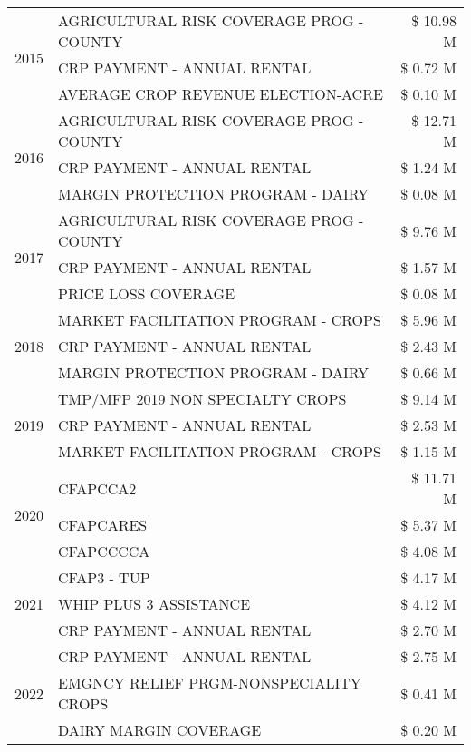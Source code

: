 \begin{tabular}{llr}
\cline{1-3}
\multirow[t]{3}{*}{2015} & AGRICULTURAL RISK COVERAGE PROG - COUNTY & \$ 10.98 M \\
 & CRP PAYMENT - ANNUAL RENTAL & \$ 0.72 M \\
 & AVERAGE CROP REVENUE ELECTION-ACRE & \$ 0.10 M \\
\cline{1-3}
\multirow[t]{3}{*}{2016} & AGRICULTURAL RISK COVERAGE PROG - COUNTY & \$ 12.71 M \\
 & CRP PAYMENT - ANNUAL RENTAL & \$ 1.24 M \\
 & MARGIN PROTECTION PROGRAM - DAIRY & \$ 0.08 M \\
\cline{1-3}
\multirow[t]{3}{*}{2017} & AGRICULTURAL RISK COVERAGE PROG - COUNTY & \$ 9.76 M \\
 & CRP PAYMENT - ANNUAL RENTAL & \$ 1.57 M \\
 & PRICE LOSS COVERAGE & \$ 0.08 M \\
\cline{1-3}
\multirow[t]{3}{*}{2018} & MARKET FACILITATION PROGRAM - CROPS & \$ 5.96 M \\
 & CRP PAYMENT - ANNUAL RENTAL & \$ 2.43 M \\
 & MARGIN PROTECTION PROGRAM - DAIRY & \$ 0.66 M \\
\cline{1-3}
\multirow[t]{3}{*}{2019} & TMP/MFP 2019 NON SPECIALTY CROPS & \$ 9.14 M \\
 & CRP PAYMENT - ANNUAL RENTAL & \$ 2.53 M \\
 & MARKET FACILITATION PROGRAM - CROPS & \$ 1.15 M \\
\cline{1-3}
\multirow[t]{3}{*}{2020} & CFAPCCA2 & \$ 11.71 M \\
 & CFAPCARES & \$ 5.37 M \\
 & CFAPCCCCA & \$ 4.08 M \\
\cline{1-3}
\multirow[t]{3}{*}{2021} & CFAP3 - TUP & \$ 4.17 M \\
 & WHIP PLUS 3 ASSISTANCE & \$ 4.12 M \\
 & CRP PAYMENT - ANNUAL RENTAL & \$ 2.70 M \\
\cline{1-3}
\multirow[t]{3}{*}{2022} & CRP PAYMENT - ANNUAL RENTAL & \$ 2.75 M \\
 & EMGNCY RELIEF PRGM-NONSPECIALITY CROPS & \$ 0.41 M \\
 & DAIRY MARGIN COVERAGE & \$ 0.20 M \\
\cline{1-3}
\bottomrule
\end{tabular}
